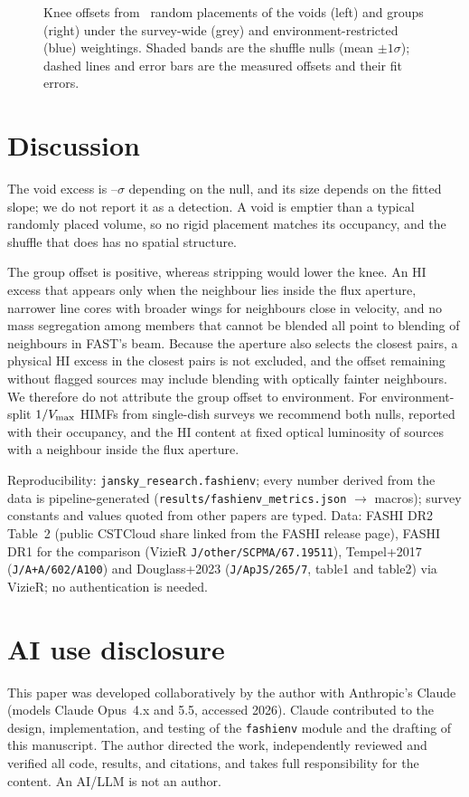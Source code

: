 \documentclass[twocolumn]{aastex631}
\newcommand{\code}[1]{\texttt{#1}}
\begin{document}
\begin{figure}
\caption{Knee offsets from \feRealEnvNullReps\ random placements of the voids (left) and groups
(right) under the survey-wide (grey) and environment-restricted (blue) weightings. Shaded bands are
the shuffle nulls (mean $\pm1\sigma$); dashed lines and error bars are the measured offsets and
their fit errors.}
\label{fig:nulls}
\end{figure}

\section{Discussion}
\label{sec:discussion}
The void excess is \feRealEnvVoidQuadSigma--\feRealShufVoidEnvSigma$\sigma$ depending on the null, and
its size depends on the fitted slope; we do not report it as a detection. A void is emptier than a
typical randomly placed volume, so no rigid placement matches its occupancy, and the shuffle that
does has no spatial structure.

The group offset is positive, whereas stripping would lower the knee. An HI excess that appears
only when the neighbour lies inside the flux aperture, narrower line cores with broader wings for
neighbours close in velocity, and no mass segregation among members that cannot be blended all
point to blending of neighbours in FAST's beam. Because the aperture also selects the closest
pairs, a physical HI excess in the closest pairs is not excluded, and the offset remaining without
flagged sources may include blending with optically fainter neighbours. We therefore do not
attribute the group offset to environment. For environment-split $1/V_{\rm max}$ HIMFs from
single-dish surveys we recommend both nulls, reported with their occupancy, and the HI content at
fixed optical luminosity of sources with a neighbour inside the flux aperture.

Reproducibility: \code{jansky\_research.fashienv}; every number derived from the data is
pipeline-generated (\code{results/fashienv\_metrics.json} $\to$ macros); survey constants and
values quoted from other papers are typed. Data: FASHI DR2 Table~2 (public CSTCloud share linked
from the FASHI release page), FASHI DR1 for the comparison (VizieR \code{J/other/SCPMA/67.19511}),
Tempel+2017 (\code{J/A+A/602/A100}) and Douglass+2023 (\code{J/ApJS/265/7}, table1 and table2) via
VizieR; no authentication is needed.

\section*{AI use disclosure}
This paper was developed collaboratively by the author with Anthropic's Claude
\citep{anthropicclaude} (models Claude Opus~4.x and 5.5, accessed 2026). Claude contributed to the design,
implementation, and testing of the \code{fashienv} module and the drafting of this manuscript.
The author directed the work, independently reviewed and verified all code, results, and
citations, and takes full responsibility for the content. An AI/LLM is not an author.
\end{document}
